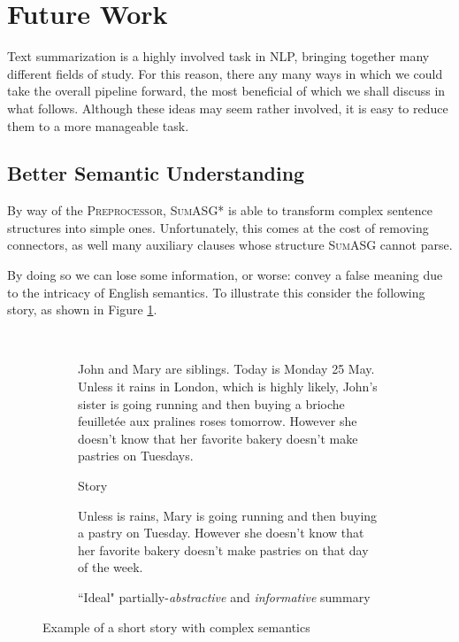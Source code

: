 \section{Future Work}
\label{sec:future_work}

Text summarization is a highly involved task in NLP, bringing together many different fields of study. For this reason, there any many ways in which we could take the overall pipeline forward, the most beneficial of which we shall discuss in what follows. Although these ideas may seem rather involved, it is easy to reduce them to a more manageable task.

\subsection{Better Semantic Understanding}

By way of the \textsc{Preprocessor}, \textsc{SumASG*} is able to transform complex sentence structures into simple ones. Unfortunately, this comes at the cost of removing connectors, as well many auxiliary clauses whose structure \textsc{SumASG} cannot parse.

By doing so we can lose some information, or worse: convey a false meaning due to the intricacy of English semantics. To illustrate this consider the following story, as shown in Figure \ref{fig:complex_summary}.

\begin{figure}[H]\
\begin{subfigure}{\textwidth}
\begin{displayquote}
John and Mary are siblings. Today is Monday 25 May. Unless it rains in London, which is highly likely, John's sister is going running and then buying a brioche feuilletée aux pralines roses tomorrow. However she doesn't know that her favorite bakery doesn't make pastries on Tuesdays.
\end{displayquote}
\caption{Story}
\vspace{\baselineskip}
\end{subfigure}
\begin{subfigure}{\textwidth}
\begin{displayquote}
Unless is rains, Mary is going running and then buying a pastry on Tuesday. However she doesn't know that her favorite bakery doesn't make pastries on that day of the week.
\caption{``Ideal" partially-\textit{abstractive} and \textit{informative} summary}
\end{displayquote}
\end{subfigure}
\caption{Example of a short story with complex semantics}
\label{fig:complex_summary}
\end{figure}


